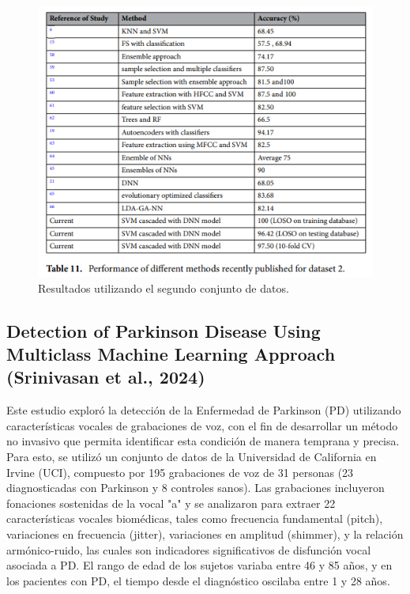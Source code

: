 \documentclass[listof=nochaptergap,12pt,times,authoryear]{report}
\begin{document}
\begin{figure}[H]
    \centering
    \includegraphics[width=\textwidth]{A1 - b2.png}
    \caption{Resultados utilizando el segundo conjunto de datos.}
    \label{fig:resultados_kfold}
\end{figure}

\subsection{Detection of Parkinson Disease Using Multiclass Machine Learning Approach (Srinivasan et al., 2024)}

Este estudio exploró la detección de la Enfermedad de Parkinson (PD) utilizando características vocales de grabaciones de voz, con el fin de desarrollar un método no invasivo que permita identificar esta condición de manera temprana y precisa. Para esto, se utilizó un conjunto de datos de la Universidad de California en Irvine (UCI), compuesto por 195 grabaciones de voz de 31 personas (23 diagnosticadas con Parkinson y 8 controles sanos). Las grabaciones incluyeron fonaciones sostenidas de la vocal "a" y se analizaron para extraer 22 características vocales biomédicas, tales como frecuencia fundamental (pitch), variaciones en frecuencia (jitter), variaciones en amplitud (shimmer), y la relación armónico-ruido, las cuales son indicadores significativos de disfunción vocal asociada a PD. El rango de edad de los sujetos variaba entre 46 y 85 años, y en los pacientes con PD, el tiempo desde el diagnóstico oscilaba entre 1 y 28 años.
\end{document}
